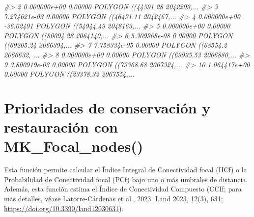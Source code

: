 \documentclass[
]{book}
\newenvironment{Shaded}{\begin{snugshade}}{\end{snugshade}}
\newcommand{\CommentTok}[1]{\textcolor[rgb]{0.56,0.35,0.01}{\textit{#1}}}
\begin{document}
\begin{Shaded}
\begin{Highlighting}[]
\CommentTok{\#\textgreater{} 2  0.000000e+00   0.00000 POLYGON ((44591.28 2042209,...}
\CommentTok{\#\textgreater{} 3  7.274621e{-}03   0.00000 POLYGON ((46491.11 2042467,...}
\CommentTok{\#\textgreater{} 4  0.000000e+00 {-}36.02491 POLYGON ((54944.49 2048163,...}
\CommentTok{\#\textgreater{} 5  0.000000e+00   0.00000 POLYGON ((80094.28 2064140,...}
\CommentTok{\#\textgreater{} 6  5.309968e{-}08   0.00000 POLYGON ((69205.24 2066394,...}
\CommentTok{\#\textgreater{} 7  7.758334e{-}05   0.00000 POLYGON ((68554.2 2066632, ...}
\CommentTok{\#\textgreater{} 8  0.000000e+00   0.00000 POLYGON ((69995.53 2066880,...}
\CommentTok{\#\textgreater{} 9  3.800919e{-}03   0.00000 POLYGON ((79368.68 2067324,...}
\CommentTok{\#\textgreater{} 10 1.064417e+00   0.00000 POLYGON ((23378.32 2067554,...}
\end{Highlighting}
\end{Shaded}

\chapter{Prioridades de conservación y restauración con MK\_Focal\_nodes()}\label{prioridades-de-conservaciuxf3n-y-restauraciuxf3n-con-mk_focal_nodes}

Esta función permite calcular el Índice Integral de Conectividad focal (IICf) o la Probabilidad de Conectividad focal (PCf) bajo uno o más umbrales de distancia. Además, esta función estima el Índice de Conectividad Compuesto (CCIf; para más detalles, véase Latorre-Cárdenas et al., 2023. Land 2023, 12(3), 631; \url{https://doi.org/10.3390/land12030631}).
\end{document}
